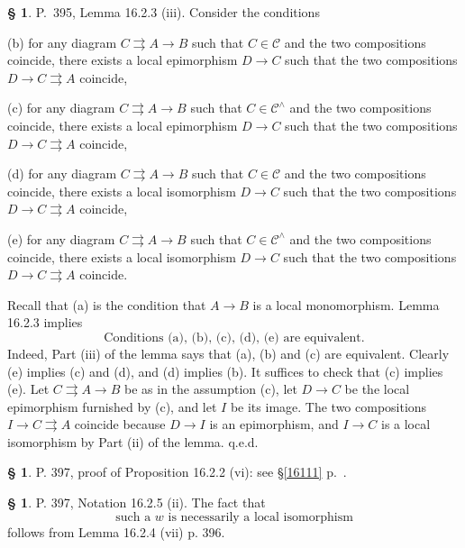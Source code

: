 \documentclass[12pt]{article}%
\theoremstyle{remark}
\theoremstyle{definition}
\newtheorem{s}[thm]{\S}%
\newcommand{\C}{\mathcal C}
\newcommand{\parar}{\rightrightarrows}
\begin{document}
%

\begin{s}\label{s1623}
P.~395, Lemma 16.2.3 (iii). Consider the conditions

\noindent(b) for any diagram $C\parar A\to B$ such that $C\in\C$ and the two compositions coincide, there exists a local epimorphism $D\to C$ such that the two compositions $D\to C\parar A$ coincide,

\noindent(c) for any diagram $C\parar A\to B$ such that $C\in\C^\wedge$ and the two compositions coincide, there exists a local epimorphism $D\to C$ such that the two compositions $D\to C\parar A$ coincide,

\noindent(d) for any diagram $C\parar A\to B$ such that $C\in\C$ and the two compositions coincide, there exists a local isomorphism $D\to C$ such that the two compositions $D\to C\parar A$ coincide,

\noindent(e) for any diagram $C\parar A\to B$ such that $C\in\C^\wedge$ and the two compositions coincide, there exists a local isomorphism $D\to C$ such that the two compositions $D\to C\parar A$ coincide.

Recall that (a) is the condition that $A\to B$ is a local monomorphism. Lemma 16.2.3 implies 
%
\begin{equation}\label{e1623}
\text{Conditions (a), (b), (c), (d), (e) are equivalent.}
\end{equation}
%
Indeed, Part (iii) of the lemma says that (a), (b) and (c) are equivalent. Clearly (e) implies (c) and (d), and (d) implies (b). It suffices to check that (c) implies (e). Let $C\parar A\to B$ be as in the assumption (c), let $D\to C$ be the local epimorphism furnished by (c), and let $I$ be its image. The two compositions $I\to C\parar A$ coincide because $D\to I$ is an epimorphism, and $I\to C$ is a local isomorphism by Part (ii) of the lemma. q.e.d.
\end{s}

%

\begin{s}
P. 397, proof of Proposition 16.2.2 (vi): see \S\ref{16111} p.~\pageref{16111}.
\end{s}

%

\begin{s} 
P. 397, Notation 16.2.5 (ii). The fact that 
\begin{equation}\label{1625}
\text{such a $w$ is necessarily a local isomorphism}
\end{equation}
follows from Lemma 16.2.4 (vii) p. 396.
\end{s}
\end{document}
